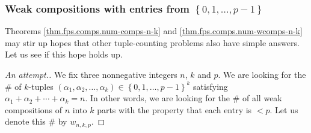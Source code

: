 \subsubsection{Weak compositions with entries from $\left\{  0,1,\ldots
,p-1\right\}  $}

Theorems \ref{thm.fps.comps.num-comps-n-k} and
\ref{thm.fps.comps.num-wcomps-n-k} may stir up hopes that other tuple-counting
problems also have simple answers. Let us see if this hope holds up.

\begin{proof}
[An attempt.]We fix three nonnegative integers $n$, $k$ and $p$. We are
looking for the \# of $k$-tuples $\left(  \alpha_{1},\alpha_{2},\ldots
,\alpha_{k}\right)  \in\left\{  0,1,\ldots,p-1\right\}  ^{k}$ satisfying
$\alpha_{1}+\alpha_{2}+\cdots+\alpha_{k}=n$. In other words, we are looking
for the \# of all weak compositions of $n$ into $k$ parts with the property
that each entry is $<p$. Let us denote this \# by $w_{n,k,p}$.


\end{proof}
